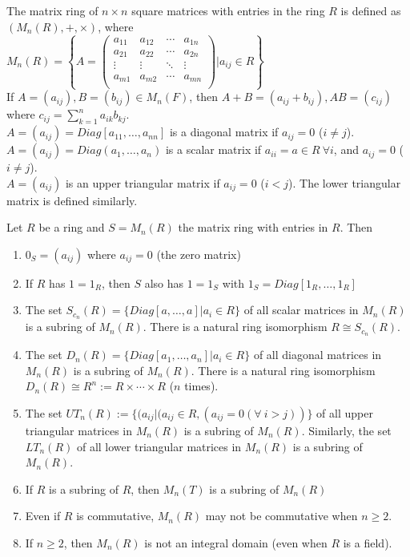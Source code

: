 \begin{remark}
The {{\color{blue} matrix ring of $n \times n$ square matrices with entries in the ring $R$}} is defined as $(M_n(R), +, \times)$, where\\
$M_n(R) = \left\{A=\begin{pmatrix}
a_{11} & a_{12} & \cdots & a_{1n}\\
a_{21} & a_{22} & \cdots & a_{2n}\\
\vdots & \vdots & \ddots & \vdots\\
a_{m1} & a_{m2} & \cdots & a_{mn}\\
\end{pmatrix} | a_{ij} \in R \right\}$\\
If $A = (a_{ij}), B = (b_{ij}) \in M_n(F)$, then $A+B=(a_{ij} + b_{ij}), AB = (c_{ij})$ where $c_{ij} = \sum_{k=1}^{n} a_{ik} b_{kj}$.\\
$A=(a_{ij}) = Diag[a_{11}, \ldots, a_{nn}]$ is a diagonal matrix if $a_{ij} = 0$ ($i \neq j$).\\
$A=(a_{ij}) = Diag(a_1, \ldots, a_n)$ is a scalar matrix if $a_{ii} = a \in R \ \forall i$, and $a_{ij} = 0$ ($i \neq j$).\\
$A=(a_{ij})$ is an upper triangular matrix if $a_{ij}=0$ ($i < j$). The lower triangular matrix is defined similarly.\\
\end{remark}


\begin{remark}
Let $R$ be a ring and $S = M_n(R)$ the matrix ring with entries in $R$. Then
\begin{enumerate}[label=(\roman*)]
\item $0_S=(a_{ij})$ where $a_{ij} = 0$ (the zero matrix)
\item If $R$ has $1 = 1_R$, then $S$ also has $1 = 1_S$ with $1_S = Diag[1_R, \ldots, 1_R]$
\item The set $S_{c_n}(R) = \{Diag[a, \ldots, a] | a_i \in R\}$ of all scalar matrices in $M_n(R)$ is a subring of $M_n(R)$. There is a natural ring isomorphism $R \cong S_{c_n}(R)$.
\item The set $D_n(R) = \{Diag[a_1, \ldots, a_n] | a_i \in R\}$ of all diagonal matrices in $M_n(R)$ is a subring of $M_n(R)$. There is a natural ring isomorphism $D_n(R) \cong R^n := R \times \cdots \times R $ ($n$ times).
\item The set $UT_n(R):= \{(a_{ij} | (a_{ij} \in R, (a_{ij} = 0 (\forall \ i > j))\}$ of all upper triangular matrices in $M_n(R)$ is a subring of $M_n(R)$. Similarly, the set $LT_n(R)$ of all lower triangular matrices in $M_n(R)$ is a subring of $M_n(R)$.
\item If $R$ is a subring of $R$, then $M_n(T)$ is a subring of $M_n(R)$
\item Even if $R$ is commutative, $M_n(R)$ may not be commutative when $n \geq 2$.
\item If $n \geq 2$, then $M_n(R)$ is not an integral domain (even when $R$ is a field).
\end{enumerate}
\end{remark}


